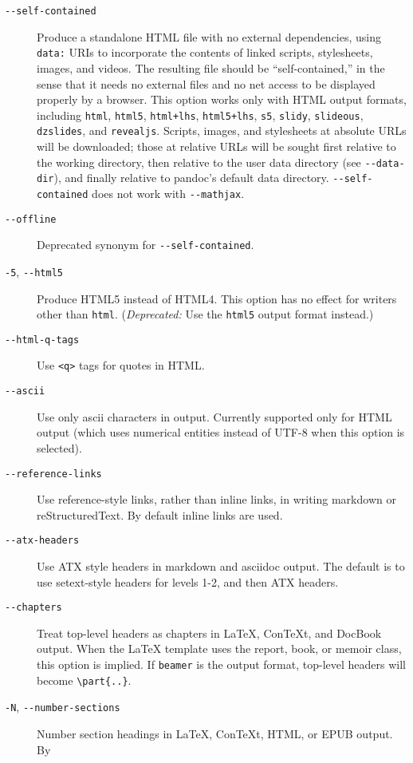 \documentclass[]{article}
\begin{document}
\begin{description}
\item[\texttt{-{}-self-contained}]
Produce a standalone HTML file with no external dependencies, using
\texttt{data:} URIs to incorporate the contents of linked scripts,
stylesheets, images, and videos. The resulting file should be
``self-contained,'' in the sense that it needs no external files and no
net access to be displayed properly by a browser. This option works only
with HTML output formats, including \texttt{html}, \texttt{html5},
\texttt{html+lhs}, \texttt{html5+lhs}, \texttt{s5}, \texttt{slidy},
\texttt{slideous}, \texttt{dzslides}, and \texttt{revealjs}. Scripts,
images, and stylesheets at absolute URLs will be downloaded; those at
relative URLs will be sought first relative to the working directory,
then relative to the user data directory (see \texttt{-{}-data-dir}),
and finally relative to pandoc's default data directory.
\texttt{-{}-self-contained} does not work with \texttt{-{}-mathjax}.
\item[\texttt{-{}-offline}]
Deprecated synonym for \texttt{-{}-self-contained}.
\item[\texttt{-5}, \texttt{-{}-html5}]
Produce HTML5 instead of HTML4. This option has no effect for writers
other than \texttt{html}. (\emph{Deprecated:} Use the \texttt{html5}
output format instead.)
\item[\texttt{-{}-html-q-tags}]
Use \texttt{\textless{}q\textgreater{}} tags for quotes in HTML.
\item[\texttt{-{}-ascii}]
Use only ascii characters in output. Currently supported only for HTML
output (which uses numerical entities instead of UTF-8 when this option
is selected).
\item[\texttt{-{}-reference-links}]
Use reference-style links, rather than inline links, in writing markdown
or reStructuredText. By default inline links are used.
\item[\texttt{-{}-atx-headers}]
Use ATX style headers in markdown and asciidoc output. The default is to
use setext-style headers for levels 1-2, and then ATX headers.
\item[\texttt{-{}-chapters}]
Treat top-level headers as chapters in LaTeX, ConTeXt, and DocBook
output. When the LaTeX template uses the report, book, or memoir class,
this option is implied. If \texttt{beamer} is the output format,
top-level headers will become \texttt{\textbackslash{}part\{..\}}.
\item[\texttt{-N}, \texttt{-{}-number-sections}]
Number section headings in LaTeX, ConTeXt, HTML, or EPUB output. By

\end{description}
\end{document}
